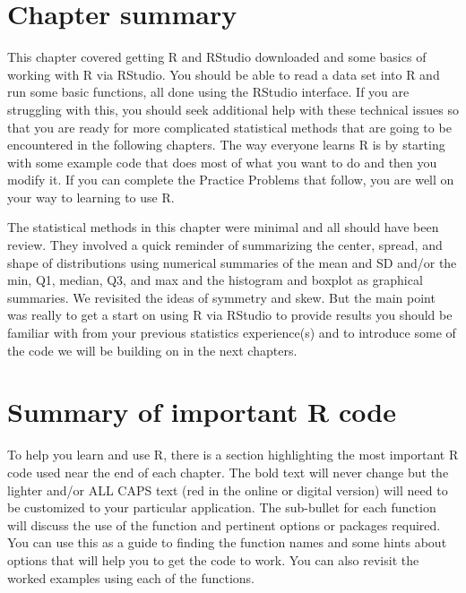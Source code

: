 \documentclass[
]{book}
\begin{document}
\hypertarget{section1-7}{%
\section{Chapter summary}\label{section1-7}}

This chapter covered getting R and RStudio downloaded and some basics of working with
R via RStudio. You should be able to read a data set into R and run some basic
functions, all done using the RStudio interface. If you are struggling with
this, you should seek additional help with these technical issues so that you
are ready for more complicated statistical methods that are going to be
encountered in the following chapters. The way everyone learns R is
by starting with some example code that does most of what you want to do and
then you modify it. If you can complete the Practice Problems that follow, you
are well on your way to learning to use R.

\indent The statistical methods in this chapter were minimal and all should have been
review. They involved a quick reminder of summarizing the center, spread, and
shape of distributions using numerical summaries of the mean and SD and/or the
min, Q1, median, Q3, and max and the histogram and boxplot as graphical
summaries. We revisited the ideas of symmetry and skew. But the main point was
really to get a start on using R via RStudio to provide results you should be familiar with
from your previous statistics experience(s) and to introduce some of the code we
will be building on in the next chapters.

\newpage

\hypertarget{section1-8}{%
\section{Summary of important R code}\label{section1-8}}

To help you learn and use R, there is a section highlighting the most important
R code used near the end of each
chapter. The bold text will never change but the
lighter and/or ALL CAPS text (red in the online or digital version) will need
to be customized to your particular application. The sub-bullet for each
function will discuss the use of the function and pertinent options or packages
required. You can use this as a guide to finding the function names and some
hints about options that will help you to get the code to work. You can also
revisit the worked examples using each of the functions.
\end{document}
